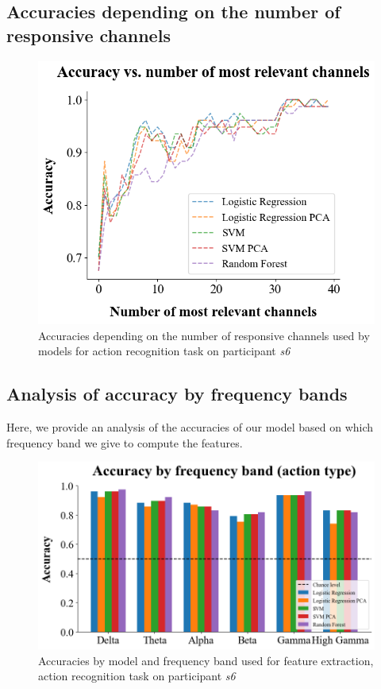 \documentclass[10pt,conference,compsocconf]{IEEEtran}
\begin{document}
\subsection{Accuracies depending on the number of responsive channels}

\begin{figure}[h!]
    \center
    \includegraphics[width=\linewidth]{../Code/figures/s6_acc_vs_channels.png}
    \caption{Accuracies depending on the number of responsive channels used by models for action recognition task on participant \textit{s6}}
    \label{appfig:accuracies_ExObs_freq_bands_channels}
\end{figure}
\FloatBarrier

\subsection{Analysis of accuracy by frequency bands}
Here, we provide an analysis of the accuracies of our model based on which frequency band we give to compute the features.

\begin{figure}[h!]
    \center
    \includegraphics[width=\linewidth]{../Code/figures/s6_accuracies_ExObs_freq_bands.png}
    \caption{Accuracies by model and frequency band used for feature extraction, action recognition task on participant \textit{s6}}
    \label{appfig:accuracies_ExObs_freq_bands_freqs}
\end{figure}
\FloatBarrier
\end{document}
